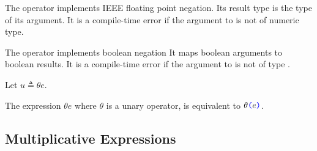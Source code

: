 \documentclass{article}
\begin{document}
The \MINUS{} operator implements IEEE floating point negation. Its result type is the type of its argument. It is a compile-time error if the argument to \MINUS{} is not of numeric type. 

The \NOT{} operator implements boolean negation It maps boolean arguments to boolean results. It is a compile-time error if the argument to \NOT{} is not of type \BOOL.

\UnaryExpression{}

Let $u \triangleq \theta{} e$.

The expression $\theta e$ where $\theta$ is a unary operator, is equivalent to $\theta\texttt{\color{blue} (}{}e\texttt{\color{blue} )}{}$.

\subsection{Multiplicative Expressions}
\label{multiplicativeExpressions}
\end{document}
